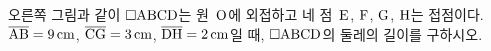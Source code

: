 \noindent\begin{minipage}[t]{0.58\linewidth}\vspace{0pt}\raggedright 오른쪽 그림과 같이 $\square\mathrm{ABCD}$는 원~$\mathrm{O}$에 외접하고 네 점~$\mathrm{E}$, $\mathrm{F}$, $\mathrm{G}$, $\mathrm{H}$는 접점이다. $\overline{\mathrm{AB}}=9\,\mathrm{cm}$, $\overline{\mathrm{CG}}=3\,\mathrm{cm}$, $\overline{\mathrm{DH}}=2\,\mathrm{cm}$일 때, $\square\mathrm{ABCD}$의 둘레의 길이를 구하시오.\end{minipage}\hfill\begin{minipage}[t]{0.4\linewidth}\vspace{0pt}\centering \resizebox{\ifdim\width>\linewidth\linewidth\else\width\fi}{!}{}\end{minipage}\par
